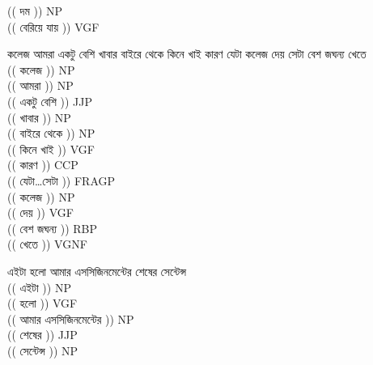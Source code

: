 \documentclass[11pt,a4paper,twocolumn]{article}
\begin{document}
\begin{enumerate}
{		\textcolor{diff}{(( দম ))} NP\\		
		\textcolor{diff}{(( বেরিয়ে যায় ))} VGF\\
$ $\\		
		\item কলেজ আমরা একটু বেশি খাবার বাইরে থেকে কিনে 
		খাই কারণ যেটা কলেজ দেয় সেটা বেশ জঘন্য খেতে  \\
		$ $\\
		\textcolor{diff}{(( কলেজ ))} NP\\		
		\textcolor{diff}{(( আমরা ))} NP\\		
		\textcolor{diff}{(( একটু বেশি ))} JJP\\		
		\textcolor{diff}{(( খাবার ))} NP\\		
		\textcolor{diff}{(( বাইরে থেকে ))} NP\\		
		\textcolor{diff}{(( কিনে খাই ))} VGF\\		
		\textcolor{diff}{(( কারণ ))} CCP\\		
		\textcolor{diff}{(( যেটা\ldots সেটা ))} FRAGP\\		
		\textcolor{diff}{(( কলেজ ))} NP\\		
		\textcolor{diff}{(( দেয় ))} VGF\\		
		\textcolor{diff}{(( বেশ জঘন্য ))} RBP\\		
		\textcolor{diff}{(( খেতে ))} VGNF\\		
$ $\\		
		\item এইটা হলো আমার এসসিজিনমেন্টের শেষের সেন্টেন্স  \\
		$ $\\
		\textcolor{diff}{(( এইটা ))} NP\\		
		\textcolor{diff}{(( হলো ))} VGF\\		
		\textcolor{diff}{(( আমার এসসিজিনমেন্টের ))} NP\\		
		\textcolor{diff}{(( শেষের ))} JJP\\		
		\textcolor{diff}{(( সেন্টেন্স ))} NP\\
		
				
		
	}	
	
	\end{enumerate}
\end{document}
